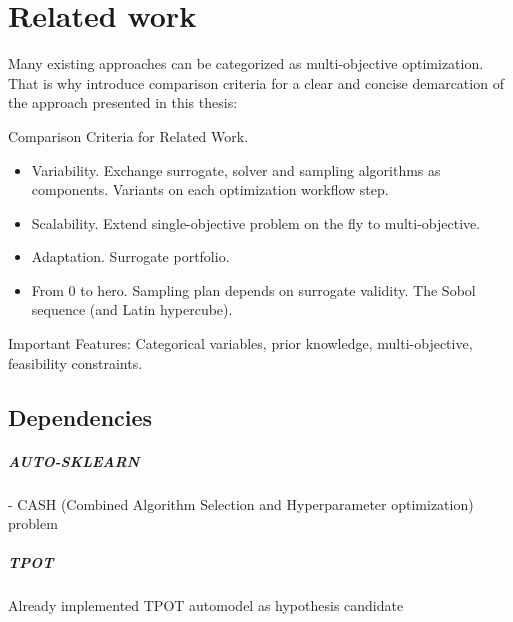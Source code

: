 \chapter{Related work}
    Many existing approaches can be categorized as multi-objective optimization. That is why
    introduce comparison criteria for a clear and concise demarcation of the approach presented in this thesis:

    Comparison Criteria for Related Work. 
    \begin{itemize}
        \item Variability. Exchange surrogate, solver and sampling algorithms as components. Variants on each optimization workflow step.
        \item Scalability. Extend single-objective problem on the fly to multi-objective.
        \item Adaptation. Surrogate portfolio.
        \item From 0 to hero. Sampling plan depends on surrogate validity. The Sobol sequence (and Latin hypercube).                
    \end{itemize}
    Important Features: Categorical variables, prior knowledge, multi-objective, feasibility constraints.



    \section{Dependencies}

    \paragraph{AUTO-SKLEARN} \cite{autosklearn:feurer2015efficient}
    - CASH (Combined Algorithm Selection and Hyperparameter optimization) problem

    \paragraph{TPOT} \cite{OlsonGECCO2016}
    Already implemented TPOT automodel as hypothesis candidate

